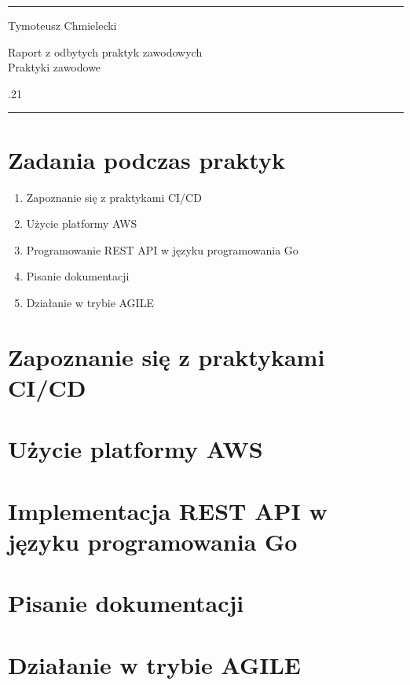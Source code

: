 \documentclass[a4paper]{article}
\begin{document}

\fancyhead[C]{}
\hrule \medskip %
\begin{minipage}{0.295\textwidth} 
\raggedright
\footnotesize
Tymoteusz Chmielecki \hfill\\   
\end{minipage}
\begin{minipage}{0.4\textwidth} 
\centering 
\large 
Raport z odbytych praktyk zawodowych\\ 
\normalsize 
Praktyki zawodowe\\ 
\end{minipage}
\begin{minipage}{0.295\textwidth} 
.21\hfill\\
\end{minipage}
\medskip\hrule 
\bigskip


\section*{Zadania podczas praktyk}
\begin{enumerate}
    \item Zapoznanie się z praktykami CI/CD
    \item Użycie platformy AWS
    \item Programowanie REST API w języku programowania Go
    \item Pisanie dokumentacji
    \item Działanie w trybie AGILE
\end{enumerate}

\section{Zapoznanie się z praktykami CI/CD}
\section{Użycie platformy AWS}
\section{Implementacja REST API w języku programowania Go}
\section{Pisanie dokumentacji}
\section{Działanie w trybie AGILE}
\end{document}
